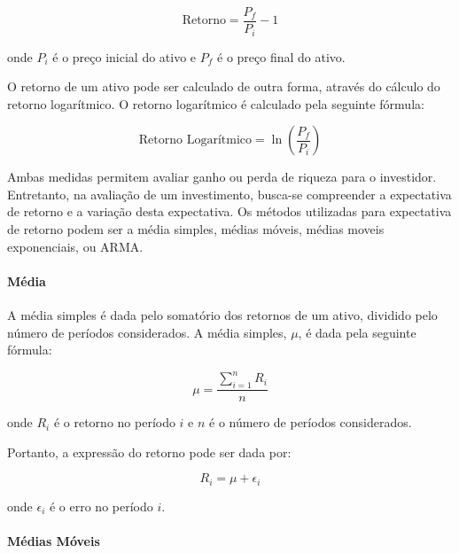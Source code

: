             \begin{equation}
                \text{Retorno} = \frac{{P_f}}{{P_i}} - 1
            \end{equation}

            \noindent onde $P_i$ é o preço inicial do ativo e $P_f$ é o preço final do ativo. 

            \ipar O retorno de um ativo pode ser calculado de outra forma, através do cálculo do retorno logarítmico. O retorno logarítmico é calculado pela seguinte fórmula:

            \begin{equation}
                \text{Retorno Logarítmico} = \ln \left( {\frac{{P_f}}{{P_i}}} \right)
            \end{equation}
            
            \ipar Ambas medidas permitem avaliar ganho ou perda de riqueza para o investidor. Entretanto, na avaliação de um investimento, busca-se compreender a expectativa de retorno e a variação desta expectativa. Os métodos utilizadas para expectativa de retorno podem ser a média simples, médias móveis, médias moveis exponenciais, ou \acrshort{ARMA}.

            \paragraph{Média}

                \ipar A média simples é dada pelo somatório dos retornos de um ativo, dividido pelo número de períodos considerados\cite{yu2020neural}. A média simples, $\mu$, é dada pela seguinte fórmula:

                \begin{equation}
                    \mu = \frac{{\sum_{i=1}^{n} R_i}}{{n}}
                \end{equation}

                \noindent onde $R_i$ é o retorno no período $i$ e $n$ é o número de períodos considerados.

                \ipar Portanto, a expressão do retorno pode ser dada por:

                \begin{equation}
                    R_{i} = \mu + \epsilon_{i}
                \end{equation}

                onde $\epsilon_{i}$ é o erro no período $i$.

            \paragraph{Médias Móveis}

